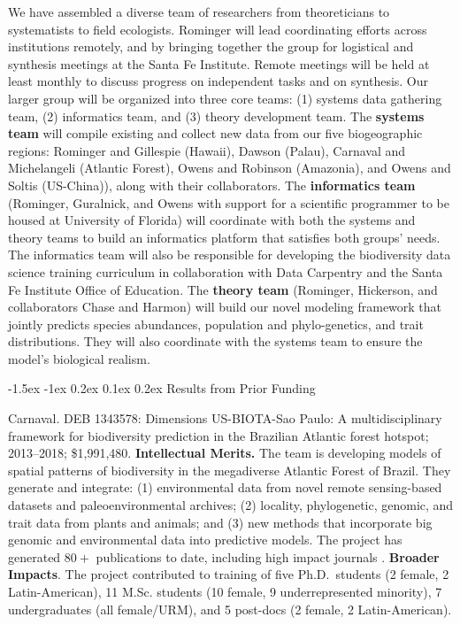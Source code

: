 \documentclass[11pt]{article}
\makeatletter
\renewcommand\section{\@startsection{section}{1}{\z@}%
                                  {-1.5ex \@plus -1ex \@minus 0.2ex}%
                                  {0.1ex \@plus 0.2ex}%
                                  {\normalfont\Large\bfseries}}
\renewcommand{\paragraph}{\@startsection{paragraph}{4}{\z@}
  {1.5ex \@plus 1ex \@minus .2ex}{-1em}
  {\normalfont\normalsize\it}
}
\makeatother
\begin{document}
We have assembled a diverse team of researchers from theoreticians to
systematists to field ecologists. Rominger will lead coordinating
efforts across institutions remotely, and by bringing together the
group for logistical and synthesis meetings at the Santa Fe
Institute. Remote meetings will be held at least monthly to discuss
progress on independent tasks and on synthesis. Our larger group will
be organized into three core teams: (1) systems data gathering team,
(2) informatics team, and (3) theory development team. The
\textbf{systems team} will compile existing and collect new data from
our five biogeographic regions: Rominger and Gillespie (Hawaii),
Dawson (Palau), Carnaval and Michelangeli (Atlantic Forest), Owens and
Robinson (Amazonia), and Owens and Soltis (US-China)), along with
their collaborators. The \textbf{informatics team} (Rominger,
Guralnick, and Owens with support for a scientific programmer to be
housed at University of Florida) will coordinate with both the systems
and theory teams to build an informatics platform that satisfies both
groups' needs. The informatics team will also be responsible for
developing the biodiversity data science training curriculum in
collaboration with Data Carpentry and the Santa Fe Institute Office of
Education. The \textbf{theory team} (Rominger, Hickerson, and
collaborators Chase and Harmon) will build our novel modeling
framework that jointly predicts species abundances, population and
phylo-genetics, and trait distributions. They will also coordinate
with the systems team to ensure the model's biological realism.

\section{Results from Prior Funding} \label{results-from-prior-funding}

\paragraph{Carnaval.} DEB 1343578: Dimensions US-BIOTA-Sao Paulo: A
multidisciplinary framework for biodiversity prediction in the Brazilian
Atlantic forest hotspot; 2013--2018; \$1,991,480. \textbf{Intellectual
Merits.} The team is developing models of spatial patterns of
biodiversity in the megadiverse Atlantic Forest of Brazil. They generate
and integrate: (1) environmental data from novel remote sensing-based
datasets and paleoenvironmental archives; (2) locality, phylogenetic,
genomic, and trait data from plants and animals; and (3) new methods
that incorporate big genomic and environmental data into predictive
models. The project has generated $80+$ publications to date,
including high impact journals
\cite{Do_Amaral2016-bi,Prates2016-at,Prates2016-gr,Maestri2016-bp,Zamborlini_Saiter2016-zu,Montade2016-wl,Bernal2016-pd,Bustamante2016-qt,Gu2017-oz}.
\textbf{Broader Impacts}. The project contributed to training of five
Ph.D.~students (2 female, 2 Latin-American), 11 M.Sc. students (10
female, 9 underrepresented minority), 7 undergraduates (all female/URM),
and 5 post-docs (2 female, 2 Latin-American).
\end{document}
